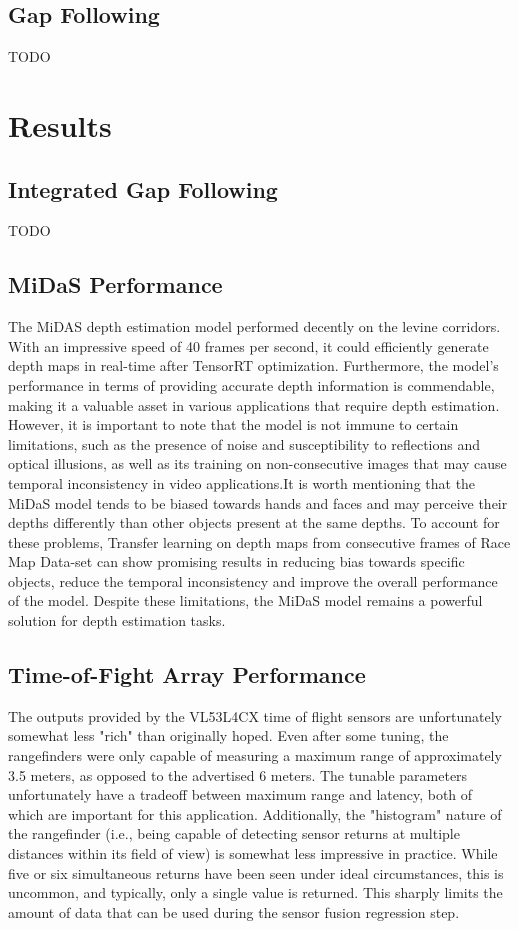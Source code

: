\documentclass[conference]{IEEEtran}
\begin{document}
\subsection{Gap Following}
TODO

\section{Results}
\subsection{Integrated Gap Following}
TODO

\subsection{MiDaS Performance}
The MiDAS depth estimation model performed decently on the levine corridors. With an impressive speed of 40 frames per second, it could efficiently generate depth maps in real-time after TensorRT optimization. Furthermore, the model's performance in terms of providing accurate depth information is commendable, making it a valuable asset in various applications that require depth estimation. However, it is important to note that the model is not immune to certain limitations, such as the presence of noise and susceptibility to reflections and optical illusions, as well as its training on non-consecutive images that may cause temporal inconsistency in video applications.It is worth mentioning that the MiDaS model tends to be biased towards hands and faces and may perceive their depths differently than other objects present at the same depths. To account for these problems, Transfer learning on depth maps from consecutive frames of Race Map Data-set can show promising results in reducing bias towards specific objects, reduce the temporal inconsistency and improve the overall performance of the model.  Despite these limitations, the MiDaS model remains a powerful solution for depth estimation tasks.

\subsection{Time-of-Fight Array Performance}
The outputs provided by the VL53L4CX time of flight sensors are unfortunately
somewhat less "rich" than originally hoped. Even after some tuning, the
rangefinders were only capable of measuring a maximum range of approximately
3.5 meters, as opposed to the advertised 6 meters. The tunable parameters
unfortunately have a tradeoff between maximum range and latency, both of which
are important for this application. Additionally, the "histogram" nature of the
rangefinder (i.e., being capable of detecting sensor returns at multiple
distances within its field of view) is somewhat less impressive in practice.
While five or six simultaneous returns have been seen under ideal
circumstances, this is uncommon, and typically, only a single value is
returned. This sharply limits the amount of data that can be used during the
sensor fusion regression step.
\end{document}
